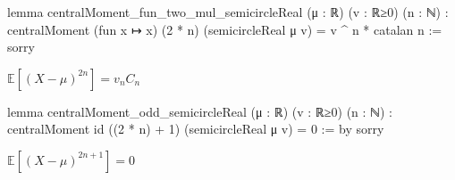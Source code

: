 lemma centralMoment_fun_two_mul_semicircleReal (μ : ℝ) (v : ℝ≥0) (n : ℕ) :
    centralMoment (fun x ↦ x) (2 * n) (semicircleReal μ v)
    = v ^ n * catalan n :=
  sorry

\begin{lemma}\label{lem:centralMoment_fun_two_mul_semicircleReal}
  \notready
   $\mathbb{E}[(X  - \mu)^{2n}] = v_n C_n $
\end{lemma}

lemma centralMoment_odd_semicircleReal (μ : ℝ) (v : ℝ≥0) (n : ℕ) :
    centralMoment id ((2 * n) + 1) (semicircleReal μ v)
    = 0 := by
  sorry

\begin{lemma}\label{lem:centralMoment_fun_odd_semicircleReal}
  \notready
   $\mathbb{E}[(X  - \mu)^{2n + 1}] = 0 $
\end{lemma}
